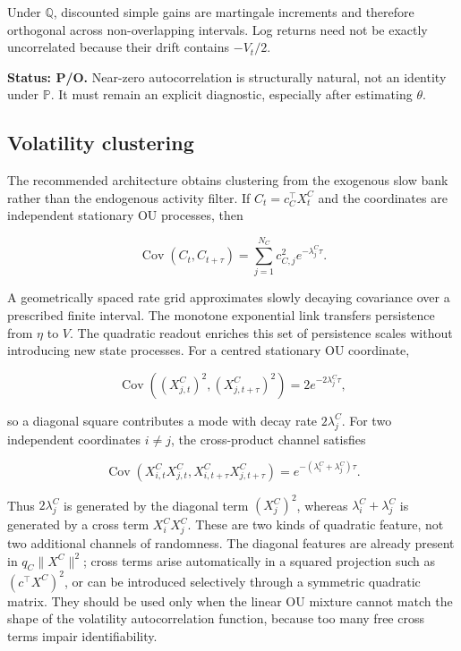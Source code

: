 \documentclass[11pt,a4paper]{article}
\newcommand{\Pp}{\mathbb{P}}
\newcommand{\Qq}{\mathbb{Q}}
\newcommand{\Cov}{\operatorname{Cov}}
\begin{document}
Under \(\Qq\), discounted simple gains are martingale increments and therefore orthogonal
across non-overlapping intervals. Log returns need not be exactly uncorrelated because their
drift contains \(-V_t/2\).

\textbf{Status: P/O.} Near-zero autocorrelation is structurally natural, not an identity under
\(\Pp\). It must remain an explicit diagnostic, especially after estimating \(\theta\).

\subsection{Volatility clustering}

The recommended architecture obtains clustering from the exogenous slow bank rather than the
endogenous activity filter. If \(C_t=c_C^\top X_t^C\) and the coordinates are independent
stationary OU processes, then

\begin{equation}
\Cov(C_t,C_{t+\tau})
=\sum_{j=1}^{N_C}c_{C,j}^2e^{-\lambda_j^C\tau}.
\label{eq:cluster-cov}
\end{equation}

A geometrically spaced rate grid approximates slowly decaying covariance over a prescribed
finite interval. The monotone exponential link transfers persistence from \(\eta\) to \(V\).
The quadratic readout enriches this set of persistence scales without introducing new state
processes.  For a centred stationary OU coordinate,

\begin{equation*}
\Cov\!\left((X_{j,t}^C)^2,(X_{j,t+\tau}^C)^2\right)
=2e^{-2\lambda_j^C\tau},
\end{equation*}

so a diagonal square contributes a mode with decay rate \(2\lambda_j^C\).  For two independent
coordinates \(i\neq j\), the cross-product channel satisfies

\begin{equation*}
\Cov\!\left(X_{i,t}^CX_{j,t}^C,
X_{i,t+\tau}^CX_{j,t+\tau}^C\right)
=e^{-(\lambda_i^C+\lambda_j^C)\tau}.
\end{equation*}

Thus \(2\lambda_j^C\) is generated by the diagonal term \((X_j^C)^2\), whereas
\(\lambda_i^C+\lambda_j^C\) is generated by a cross term \(X_i^CX_j^C\).  These are two kinds
of quadratic feature, not two additional channels of randomness.  The diagonal features are
already present in \(q_C\lVert X^C\rVert^2\); cross terms arise automatically in a squared
projection such as \((c^\top X^C)^2\), or can be introduced selectively through a symmetric
quadratic matrix.  They should be used only when the linear OU mixture cannot match the shape
of the volatility autocorrelation function, because too many free cross terms impair
identifiability.
\end{document}

